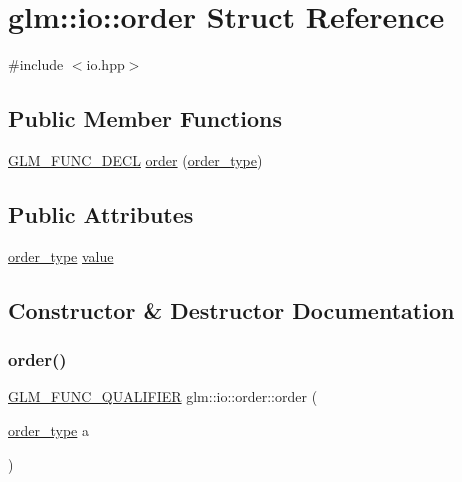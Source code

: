 \hypertarget{structglm_1_1io_1_1order}{}\section{glm\+:\+:io\+:\+:order Struct Reference}
\label{structglm_1_1io_1_1order}


{\ttfamily \#include $<$io.\+hpp$>$}

\subsection*{Public Member Functions}
\begin{DoxyCompactItemize}
\item 
\mbox{\hyperlink{setup_8hpp_ab2d052de21a70539923e9bcbf6e83a51}{G\+L\+M\+\_\+\+F\+U\+N\+C\+\_\+\+D\+E\+CL}} \mbox{\hyperlink{structglm_1_1io_1_1order_a06813d404c975865fdd3a77146268a1f}{order}} (\mbox{\hyperlink{namespaceglm_1_1io_a3497781803fe594a37177e05ab2a795f}{order\+\_\+type}})
\end{DoxyCompactItemize}
\subsection*{Public Attributes}
\begin{DoxyCompactItemize}
\item 
\mbox{\hyperlink{namespaceglm_1_1io_a3497781803fe594a37177e05ab2a795f}{order\+\_\+type}} \mbox{\hyperlink{structglm_1_1io_1_1order_aa8788dd0568bacd081d02bd5aca9889b}{value}}
\end{DoxyCompactItemize}


\subsection{Constructor \& Destructor Documentation}
\mbox{\label{structglm_1_1io_1_1order_a06813d404c975865fdd3a77146268a1f}} 
\subsubsection{\texorpdfstring{order()}{order()}}
{\footnotesize\ttfamily \mbox{\hyperlink{setup_8hpp_a33fdea6f91c5f834105f7415e2a64407}{G\+L\+M\+\_\+\+F\+U\+N\+C\+\_\+\+Q\+U\+A\+L\+I\+F\+I\+ER}} glm\+::io\+::order\+::order (\begin{DoxyParamCaption}\item[{\mbox{\hyperlink{namespaceglm_1_1io_a3497781803fe594a37177e05ab2a795f}{order\+\_\+type}}}]{a }\end{DoxyParamCaption})\hspace{0.3cm}{\ttfamily [explicit]}}



